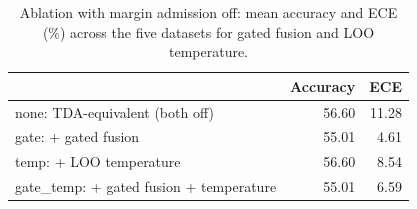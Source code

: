 \begin{table}[htbp]
\centering
\begin{tabular}{lrr}
\toprule
 & Accuracy & ECE \\
\midrule
none: TDA-equivalent (both off) & 56.60 & 11.28 \\
gate: + gated fusion & 55.01 & 4.61 \\
temp: + LOO temperature & 56.60 & 8.54 \\
gate\_temp: + gated fusion + temperature & 55.01 & 6.59 \\
\bottomrule
\end{tabular}
\caption{Ablation with margin admission off: mean accuracy and ECE (\%) across the five datasets for gated fusion and LOO temperature.}
\label{tab:ablation-gate}
\end{table}
